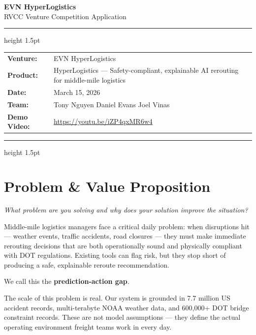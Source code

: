 \documentclass[11pt,letterpaper]{article}
\begin{document}
\begin{center}
    {\LARGE\bfseries\color{accentblue} EVN HyperLogistics}\\[0.3em]
    {\large RVCC Venture Competition Application}\\[1em]
    \hrule height 1.5pt
    \vspace{0.8em}
    \begin{tabular}{@{}ll@{}}
        \textbf{Venture:} & EVN HyperLogistics \\[0.2em]
        \textbf{Product:} & HyperLogistics --- Safety-compliant, explainable AI rerouting for middle-mile logistics \\[0.2em]
        \textbf{Date:}    & March 15, 2026 \\[0.2em]
        \textbf{Team:}    & Tony Nguyen \textperiodcentered{} Daniel Evans \textperiodcentered{} Joel Vinas \\[0.2em]
        \textbf{Demo Video:} & \href{https://youtu.be/iZP4qxMR6w4}{https://youtu.be/iZP4qxMR6w4} \\
    \end{tabular}
    \vspace{0.8em}
    \hrule height 1.5pt
\end{center}

\vspace{1em}

\section{Problem \& Value Proposition}
\textit{What problem are you solving and why does your solution improve the situation?}

\medskip
Middle-mile logistics managers face a critical daily problem: when disruptions hit --- weather events, traffic accidents, road closures --- they must make immediate rerouting decisions that are both operationally sound and physically compliant with DOT regulations. Existing tools can flag risk, but they stop short of producing a safe, explainable reroute recommendation.

We call this the \textbf{prediction-action gap}.

The scale of this problem is real. Our system is grounded in 7.7 million US accident records, multi-terabyte NOAA weather data, and 600{,}000+ DOT bridge constraint records. These are not model assumptions --- they define the actual operating environment freight teams work in every day.
\end{document}
